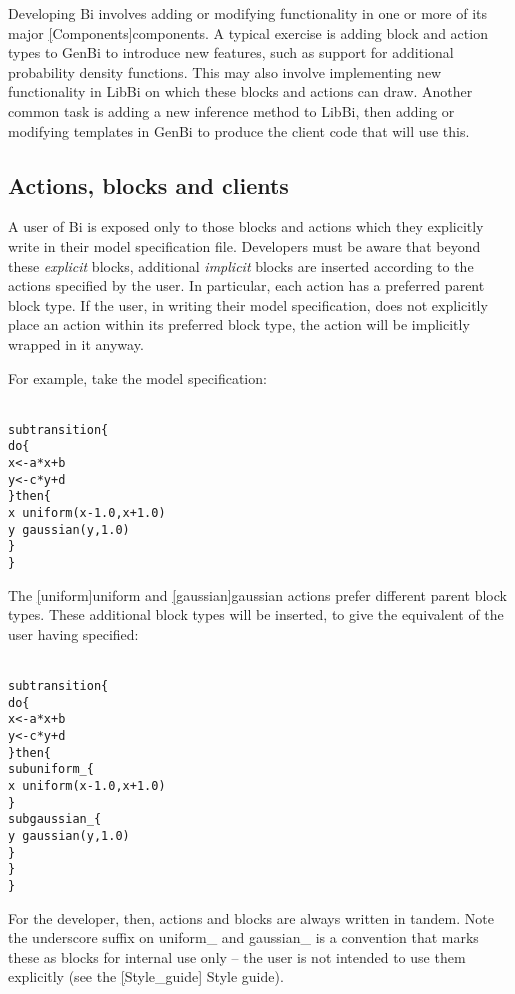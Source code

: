 Developing Bi involves adding or modifying functionality in one or more of its
major \hyperref[hyper][Components]{components}. A typical exercise is adding
block and action types to GenBi to introduce new features, such as support for
additional probability density functions. This may also involve implementing
new functionality in LibBi on which these blocks and actions can draw. Another
common task is adding a new inference method to LibBi, then adding or
modifying templates in GenBi to produce the client code that will use this.

\subsection{Actions, blocks and clients}

A user of Bi is exposed only to those blocks and actions which they explicitly
write in their model specification file. Developers must be aware that beyond
these \textit{explicit} blocks, additional \textit{implicit} blocks are
inserted according to the actions specified by the user. In particular, each
action has a preferred parent block type. If the user, in writing their model
specification, does not explicitly place an action within its
preferred block type, the action will be implicitly wrapped in it anyway.

For example, take the model specification:
\begin{alltt}{\sf
    sub transition \{
      do \{
        x <- a*x + b
        y <- c*y + d
      \} then \{
        x ~ uniform(x - 1.0, x + 1.0)
        y ~ gaussian(y, 1.0)
      \}
    \}
}\end{alltt}
The \hyperref[hyper][uniform]{\sf uniform} and
\hyperref[hyper][gaussian]{\sf gaussian} actions prefer
different parent block types. These additional block types will be inserted,
to give the equivalent of the user having specified:
\begin{alltt}{\sf
    sub transition \{
      do \{
        x <- a*x + b
        y <- c*y + d
      \} then \{
        sub uniform_ \{
          x ~ uniform(x - 1.0, x + 1.0)
        \}
        sub gaussian_ \{
          y ~ gaussian(y, 1.0)
        \}
      \}  
    \}
}\end{alltt}

For the developer, then, actions and blocks are always written in tandem.
Note the underscore suffix on \textsf{uniform\_} and \textsf{gaussian\_} is a
convention that marks these as blocks for internal use only -- the user is not
intended to use them explicitly (see the \hyperref[hyper][Style_guide]{\sf
  Style guide}).


